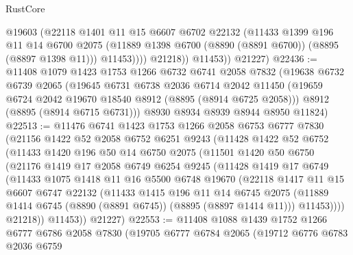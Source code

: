 \begin{lexlean}{RustCore}
\begin{coremodule}
                  @19603
                  (@22118
                    @1401
                    @11
                    @15
                    @6607
                    @6702
                    @22132
                    (@11433
                      @1399
                      @196
                      @11
                      @14
                      @6700
                      @2075
                      (@11889 @1398 @6700 (@8890 (@8891 @6700)) (@8895 (@8897 @1398 @11)))
                      @11453))))
              @21218))
          @11453))
      @21227)
@22436 := @11408
    @1079
    @1423
    @1753
    @1266
    @6732
    @6741
    @2058
    @7832
    (@19638
      @6732
      @6739
      @2065
      (@19645
        @6731
        @6738
        @2036
        @6714
        @2042
        @11450
        (@19659 @6724 @2042 @19670 @18540 @8912 (@8895 (@8914 @6725 @2058)))
        @8912
        (@8895 (@8914 @6715 @6731)))
      @8930
      @8934
      @8939
      @8944
      @8950
      @11824)
@22513 := @11476
    @6741
    @1423
    @1753
    @1266
    @2058
    @6753
    @6777
    @7830
    (@21156
      @1422
      @52
      @2058
      @6752
      @6251
      @9243
      (@11428
        @1422
        @52
        @6752
        (@11433
          @1420
          @196
          @50
          @14
          @6750
          @2075
          (@11501
            @1420
            @50
            @6750
            (@21176
              @1419
              @17
              @2058
              @6749
              @6254
              @9245
              (@11428
                @1419
                @17
                @6749
                (@11433
                  @1075
                  @1418
                  @11
                  @16
                  @5500
                  @6748
                  @19670
                  (@22118
                    @1417
                    @11
                    @15
                    @6607
                    @6747
                    @22132
                    (@11433
                      @1415
                      @196
                      @11
                      @14
                      @6745
                      @2075
                      (@11889 @1414 @6745 (@8890 (@8891 @6745)) (@8895 (@8897 @1414 @11)))
                      @11453))))
              @21218))
          @11453))
      @21227)
@22553 := @11408
    @1088
    @1439
    @1752
    @1266
    @6777
    @6786
    @2058
    @7830
    (@19705
      @6777
      @6784
      @2065
      (@19712
        @6776
        @6783
        @2036
        @6759

\end{coremodule}
\end{lexlean}
